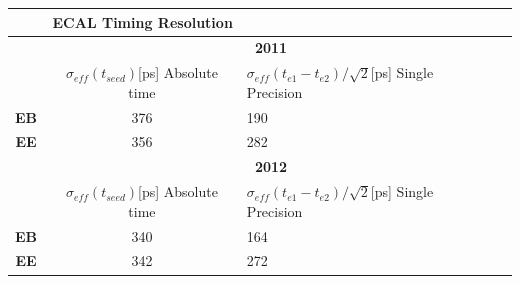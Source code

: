\begin{center}
\centering
  \begin{tabular}{|cc|l|l|} %
  \hline \hline
 
 &  \multicolumn{1}{r}{\bfseries{ECAL Timing Resolution}} \\
  \hline \hline
&  \multicolumn{2}{c}{\bfseries{2011}} \\
   \hline
   & $\sigma_{eff}(t_{seed})$[ps]
        Absolute time
   & $\sigma_{eff}(t_{e1} - t_{e2})/\sqrt{2}$[ps]   Single Precision \\ \hline
   \textbf{EB} & 376  & 190 \\
      \textbf{EE} & 356  & 282 \\
      \hline \hline
& \multicolumn{2}{c}{\bfseries{2012}}  \\
   \hline \hline
   & $\sigma_{eff}(t_{seed})$[ps]
        Absolute time
   & $\sigma_{eff}(t_{e1} - t_{e2})/\sqrt{2}$[ps]   Single Precision \\ \hline
   \textbf{EB} & 340  & 164 \\
      \textbf{EE} & 342  & 272 \\
      \hline \hline
 
  \end{tabular}
 \label{tab:TIMERes} %
 \end{center}



\label{ECAL Timing Calibration_chapter}
